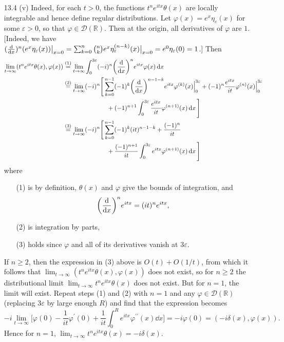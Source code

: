 \documentclass[11pt]{article}
\newcommand{\eq}[1]{\overset{(#1)}{=}}
\begin{document}
\begin{enumerate}
    \hrulefill

    \item[13.4](v) 
    Indeed, for each $t>0$, the functions $t^ne^{itx}\theta(x)$ are locally integrable and hence define regular distributions.
    Let $\varphi(x) = e^x\eta_{\varepsilon}(x)$ for some $\varepsilon>0$, so that $\varphi\in\mathcal{D}(\mathbb{R})$. Then at the origin, all derivatives of $\varphi$ are $1$. [Indeed, we have $(\dv{x})^n(e^x\eta_\varepsilon(x))\big|_{x=0} = \sum_{k=0}^n\binom{n}{k}e^x\eta_\varepsilon^{(n-k)}(x)\big|_{x=0} = e^0\eta_\varepsilon(0) = 1$.] Then \begin{align*}
        \lim_{t\to\infty}(t^ne^{itx}\theta(x),\varphi(x)) &\eq{1} \lim_{t\to\infty}\int_0^{3\varepsilon} (-i)^n\biggl(\dv{x}\biggr)^ne^{itx} \varphi(x)\dd{x}\\
        &\eq{2} \lim_{t\to\infty}(-i)^n\Bigg[\sum_{k=0}^{n-1}(-1)^k\biggl(\dv{x}\biggr)^{n-1-k}e^{itx}\varphi^{(k)}(x)\Big|_0^{3\varepsilon} + (-1)^n\frac{e^{itx}}{it}\varphi^{(n)}(x)\Big|_0^{3\varepsilon} \\&\hspace{7em} + (-1)^{n+1}\int_0^{3\varepsilon} \frac{e^{itx}}{it}\varphi^{(n+1)}(x)\dd{x}\Bigg] \\
        &\eq{3} \lim_{t\to\infty}(-i)^n\Bigg[\sum_{k=0}^{n-1}(-1)^k(it)^{n-1-k} + \frac{(-1)^n}{it} \\&\hspace{7em} + \frac{(-1)^{n+1}}{it}\int_0^{3\varepsilon} e^{itx}\varphi^{(n+1)}(x)\dd{x}\Bigg]\\
    \end{align*} where \begin{enumerate}
        \item[(1)] is by definition, $\theta(x)$ and $\varphi$ give the bounds of integration, and \[\biggl(\dv{x}\biggr)^ne^{itx} = (it)^ne^{itx},\]
        \item[(2)] is integration by parts,
        \item[(3)] holds since $\varphi$ and all of its derivatives vanish at $3\varepsilon$.
    \end{enumerate} If $n\geq 2$, then the expression in (3) above is $O(t) + O(1/t)$, from which it follows that $\lim_{t\to\infty}(t^ne^{itx}\theta(x),\varphi(x))$ does not exist, so for $n\geq 2$ the distributional limit $\lim_{t\to\infty}t^ne^{itx}\theta(x)$ does not exist. But for $n=1$, the limit will exist. Repeat steps (1) and (2) with $n = 1$ and any $\varphi\in \mathcal{D}(\mathbb{R})$ (replacing $3\varepsilon$ by large enough $R$) and find that the expression becomes \[-i\lim_{t\to\infty}\Bigg[\varphi(0) -\frac{1}{it}\varphi^\prime(0) + \frac{1}{it}\int_0^{R} e^{itx}\varphi^{\prime\prime}(x)\dd{x}\Bigg] = -i\varphi(0) = (-i\delta(x),\varphi(x)).\] Hence for $n = 1$, $\lim_{t\to\infty}t^ne^{itx}\theta(x) = -i\delta(x)$.


\end{enumerate}
\end{document}
